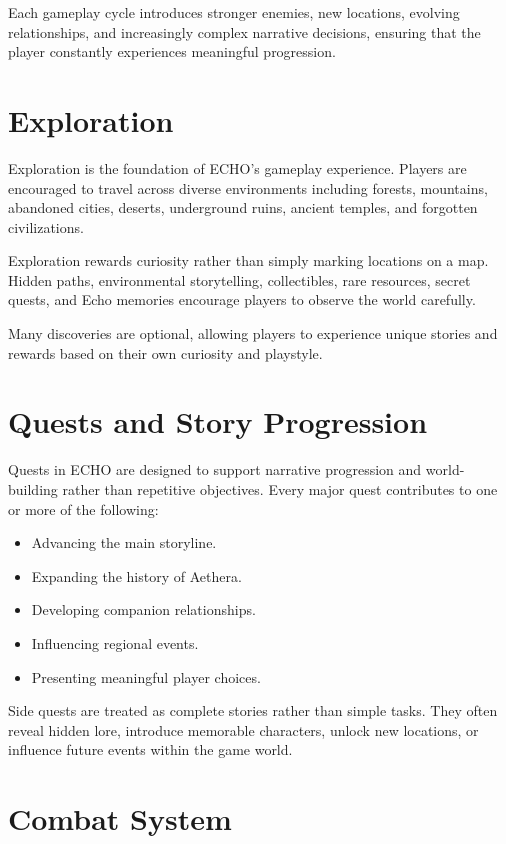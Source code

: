 Each gameplay cycle introduces stronger enemies, new locations, evolving relationships, and increasingly complex narrative decisions, ensuring that the player constantly experiences meaningful progression.

\section{Exploration}

Exploration is the foundation of ECHO's gameplay experience. Players are encouraged to travel across diverse environments including forests, mountains, abandoned cities, deserts, underground ruins, ancient temples, and forgotten civilizations.

Exploration rewards curiosity rather than simply marking locations on a map. Hidden paths, environmental storytelling, collectibles, rare resources, secret quests, and Echo memories encourage players to observe the world carefully.

Many discoveries are optional, allowing players to experience unique stories and rewards based on their own curiosity and playstyle.

\section{Quests and Story Progression}

Quests in ECHO are designed to support narrative progression and world-building rather than repetitive objectives. Every major quest contributes to one or more of the following:

\begin{itemize}
    \item Advancing the main storyline.
    \item Expanding the history of Aethera.
    \item Developing companion relationships.
    \item Influencing regional events.
    \item Presenting meaningful player choices.
\end{itemize}

Side quests are treated as complete stories rather than simple tasks. They often reveal hidden lore, introduce memorable characters, unlock new locations, or influence future events within the game world.

\section{Combat System}

